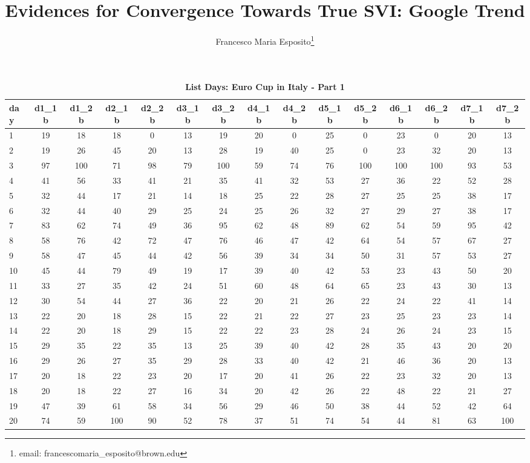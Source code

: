 \documentclass[a4paper,12pt]{article}
\begin{document}
\title{Evidences for Convergence Towards True SVI: Google Trend}
\author{Francesco Maria Esposito\footnote{email: francescomaria\_esposito@brown.edu}}
\maketitle

\newpage

\begin{landscape}
\begin{footnotesize}
\begin{center}
\begin{longtable}{lcccccccccccccc}
\caption{\textbf{List Days: Euro Cup in Italy - Part 1}\label{tab_it_1a}}
\hline
day&d1\_1b&d1\_2b&d2\_1b&d2\_2b&d3\_1b&d3\_2b&d4\_1b&d4\_2b&d5\_1b&d5\_2b&d6\_1b&d6\_2b&d7\_1b&d7\_2b \\ \hline
1&19&18&18&0&13&19&20&0&25&0&23&0&20&13 \\
2&19&26&45&20&13&28&19&40&25&0&23&32&20&13 \\
3&97&100&71&98&79&100&59&74&76&100&100&100&93&53 \\
4&41&56&33&41&21&35&41&32&53&27&36&22&52&28 \\
5&32&44&17&21&14&18&25&22&28&27&25&25&38&17 \\
6&32&44&40&29&25&24&25&26&32&27&29&27&38&17 \\
7&83&62&74&49&36&95&62&48&89&62&54&59&95&42 \\
8&58&76&42&72&47&76&46&47&42&64&54&57&67&27 \\
9&58&47&45&44&42&56&39&34&34&50&31&57&53&27 \\
10&45&44&79&49&19&17&39&40&42&53&23&43&50&20 \\
11&33&27&35&42&24&51&60&48&64&65&23&43&30&13 \\
12&30&54&44&27&36&22&20&21&26&22&24&22&41&14 \\
13&22&20&18&28&15&22&21&22&27&23&25&23&23&14 \\
14&22&20&18&29&15&22&22&23&28&24&26&24&23&15 \\
15&29&35&22&35&13&25&39&40&42&28&35&43&20&20 \\
16&29&26&27&35&29&28&33&40&42&21&46&36&20&13 \\
17&20&18&22&23&20&17&20&41&26&22&23&32&20&13 \\
18&20&18&22&27&16&34&20&42&26&22&48&22&21&27 \\
19&47&39&61&58&34&56&29&46&50&38&44&52&42&64 \\
20&74&59&100&90&52&78&37&51&74&54&44&81&63&100 \\

\end{longtable}
\end{center}
\end{footnotesize}
\end{landscape}
\end{document}
